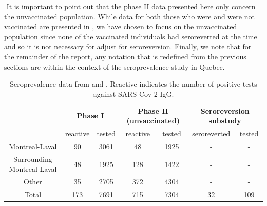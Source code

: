 \newline $ $
It is important to point out that the phase II data presented here only concern the unvaccinated population. While data for both those who were and were not vaccinated are presented in \cite{lewin2022seroprevalence}, we have chosen to focus on the unvaccinated population since none of the vaccinated individuals had seroreverted at the time and so it is not necessary for adjust for seroreversion. Finally, we note that for the remainder of the report, any notation that is redefined from the previous sections are within the context of the seroprevalence study in Quebec.

\begin{table}[]
\centering
\begin{tabular}{c|cc|cc|cc}
                           & \multicolumn{2}{c}{\textbf{Phase I}} & \multicolumn{2}{c}{\textbf{Phase II (unvaccinated)}} & \multicolumn{2}{c}{\textbf{Seroreversion substudy}}\\
                           & reactive      & tested      & reactive              & tested      & seroreverted              & tested        \\
                           \hline
Montreal-Laval             & 90            & 3061        & 48                    & 1925      & - & -          \\
Surrounding Montreal-Laval & 48            & 1925        & 128                   & 1422   & - & -             \\
Other                      & 35            & 2705        & 372                   & 4304          & - & -      \\
\hline
Total                      & 173           & 7691        & 715                   & 7304          &    32 & 109  
\end{tabular}
\caption{Seroprevalence data from \cite{lewin2021sars} and \cite{lewin2022seroprevalence}. Reactive indicates the number of positive tests against SARS-Cov-2 IgG.}
\label{tab:dat}
\end{table}
